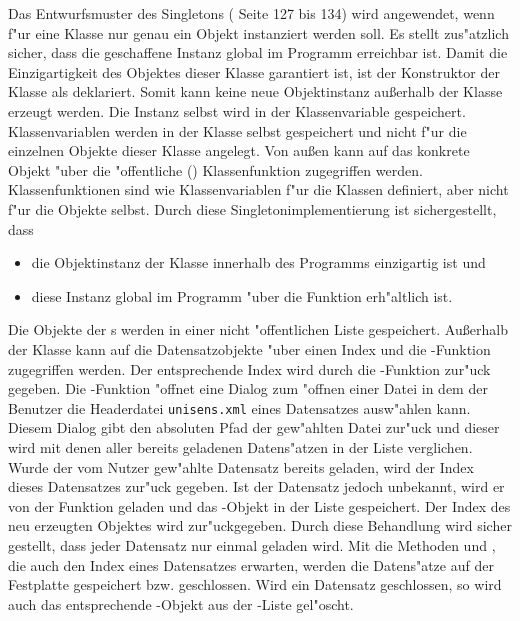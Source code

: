 Das Entwurfsmuster des Singletons (\cite{Gamma1995} Seite 127 bis 134) wird angewendet, wenn f"ur eine Klasse nur genau ein Objekt instanziert werden soll.
Es stellt zus"atzlich sicher, dass die geschaffene Instanz global im Programm erreichbar ist.
Damit die Einzigartigkeit des Objektes dieser Klasse garantiert ist, ist der Konstruktor der Klasse als  deklariert.
Somit kann keine neue Objektinstanz au{\ss}erhalb der Klasse  erzeugt werden.
Die Instanz selbst wird in der Klassenvariable  gespeichert.
Klassenvariablen werden in der Klasse selbst gespeichert und nicht f"ur die einzelnen Objekte dieser Klasse angelegt.
Von au{\ss}en kann auf das konkrete Objekt "uber die "offentliche () Klassenfunktion  zugegriffen werden.
Klassenfunktionen sind wie Klassenvariablen f"ur die Klassen definiert, aber nicht f"ur die Objekte selbst.
Durch diese Singletonimplementierung ist sichergestellt, dass
\begin{itemize}
	\item die Objektinstanz  der Klasse  innerhalb des Programms einzigartig ist und
	\item diese Instanz global im Programm "uber die Funktion  erh"altlich ist.
\end{itemize}

Die Objekte der s werden in einer nicht "offentlichen Liste  gespeichert.
Au{\ss}erhalb der Klasse kann auf die Datensatzobjekte "uber einen Index und die -Funktion zugegriffen werden.
Der entsprechende Index wird durch die -Funktion zur"uck gegeben.
Die -Funktion "offnet eine Dialog zum "offnen einer Datei in dem der Benutzer die Headerdatei \verb|unisens.xml| eines Datensatzes ausw"ahlen kann.
Diesem Dialog gibt den absoluten Pfad der gew"ahlten Datei zur"uck und dieser wird mit denen aller bereits geladenen Datens"atzen in der Liste  verglichen.
Wurde der vom Nutzer gew"ahlte Datensatz bereits geladen, wird der Index dieses Datensatzes zur"uck gegeben.
Ist der Datensatz jedoch unbekannt, wird er von der Funktion geladen und das -Objekt in der Liste gespeichert.
Der Index des neu erzeugten Objektes wird zur"uckgegeben.
Durch diese Behandlung wird sicher gestellt, dass jeder Datensatz nur einmal geladen wird.
Mit die Methoden  und , die auch den Index eines Datensatzes erwarten, werden die Datens"atze auf der Festplatte gespeichert bzw. geschlossen.
Wird ein Datensatz geschlossen, so wird auch das entsprechende -Objekt aus der -Liste gel"oscht.

